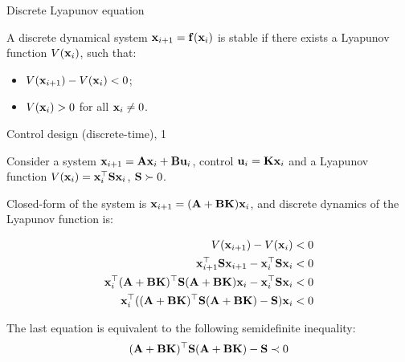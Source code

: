 \documentclass{beamer}
\begin{document}
\begin{frame}{Discrete Lyapunov equation}
	\begin{flushleft}
		
		A discrete dynamical system $\mathbf{x}_{i+1} = \mathbf{f}(\mathbf{x}_i)$ is stable if there exists a Lyapunov function $V(\mathbf{x}_i)$, such that:
		
		\begin{itemize}
			\item $V(\mathbf{x}_{i+1}) - V(\mathbf{x}_i) < 0$;
			\item $V(\mathbf{x}_i) > 0$ for all $\mathbf{x}_i \neq 0$.
		\end{itemize}
		
	\end{flushleft}
\end{frame}



\begin{frame}{Control design (discrete-time), 1}
	\begin{flushleft}
		
		Consider a system $\mathbf{x}_{i+1} = \mathbf{A}\mathbf{x}_i + \mathbf{B}\mathbf{u}_i$, control $\mathbf{u}_i = \mathbf{K}\mathbf{x}_i$ and a Lyapunov function $V(\mathbf{x}_i) = \mathbf{x}_i^\top \mathbf{S} \mathbf{x}_i$, $\mathbf{S} \succ 0$.
		
		\bigskip
		
		Closed-form of the system is $\mathbf{x}_{i+1} = (\mathbf{A} + \mathbf{B}\mathbf{K})\mathbf{x}_i$, and discrete dynamics of the Lyapunov function is:
		
		\begin{align}
			V(\mathbf{x}_{i+1}) - V(\mathbf{x}_i) <0 
			\\
			\mathbf{x}_{i+1}^\top \mathbf{S} \mathbf{x}_{i+1} - \mathbf{x}_i^\top \mathbf{S} \mathbf{x}_i < 0
			\\
			\mathbf{x}_i^\top(\mathbf{A} + \mathbf{B}\mathbf{K})^\top \mathbf{S} (\mathbf{A} + \mathbf{B}\mathbf{K})\mathbf{x}_i - \mathbf{x}_i^\top \mathbf{S} \mathbf{x}_i < 0
			\\
			\mathbf{x}_i^\top((\mathbf{A} + \mathbf{B}\mathbf{K})^\top \mathbf{S} (\mathbf{A} + \mathbf{B}\mathbf{K}) - \mathbf{S})\mathbf{x}_i < 0
		\end{align}
		
		The last equation is equivalent to the following semidefinite inequality:
		\begin{align}
		(\mathbf{A} + \mathbf{B}\mathbf{K})^\top \mathbf{S} (\mathbf{A} + \mathbf{B}\mathbf{K}) - \mathbf{S} \prec 0
		\end{align}
		
		
	\end{flushleft}
\end{frame}
\end{document}
